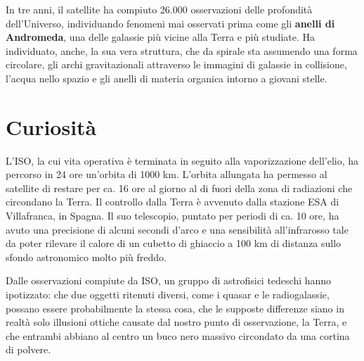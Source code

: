\documentclass[12pt,a4paper]{article}
\begin{document}
In tre anni, il satellite ha compiuto 26.000 osservazioni delle profondità dell'Universo, individuando fenomeni mai osservati prima come gli \textbf{anelli di Andromeda}, una delle galassie più vicine alla Terra e più studiate. Ha individuato, anche, la sua vera struttura, che da spirale sta assumendo una forma circolare, gli archi gravitazionali attraverso le immagini di galassie in collisione, l'acqua nello spazio e gli anelli di materia organica intorno a giovani stelle.

\section*{Curiosità}
\label{curiosit}

L'ISO, la cui vita operativa è terminata in seguito alla vaporizzazione dell'elio, ha percorso in 24 ore un'orbita di 1000 km. L'orbita allungata ha permesso al satellite di restare per ca. 16 ore al giorno al di fuori della zona di radiazioni che circondano la Terra. Il controllo dalla Terra è avvenuto dalla stazione ESA di Villafranca, in Spagna. Il suo telescopio, puntato per periodi di ca. 10 ore, ha avuto una precisione di alcuni secondi d'arco e una sensibilità all'infrarosso tale da poter rilevare il calore di un cubetto di ghiaccio a 100 km di distanza sullo sfondo astronomico molto più freddo. 

Dalle osservazioni compiute da ISO, un gruppo di astrofisici tedeschi hanno ipotizzato: che due oggetti ritenuti diversi, come i quasar e le radiogalassie, possano essere probabilmente la stessa cosa, che le supposte differenze siano in realtà solo illusioni ottiche causate dal nostro punto di osservazione, la Terra, e che entrambi abbiano al centro un buco nero massivo circondato da una cortina di polvere. 
\end{document}

